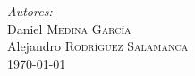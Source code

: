 \documentclass[12pt]{article}
\begin{document}
\begin{titlepage}


\emph{Autores:}\\
Daniel \textsc{Medina García}\\ %
Alejandro \textsc{Rodríguez Salamanca}\\[1.5cm] %


{\large \today}\\ %





\vfill %

\end{titlepage}

\tableofcontents
\end{document}

